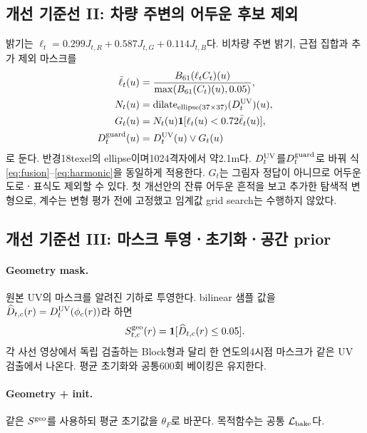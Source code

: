 \documentclass[11pt,a4paper]{article}
\newcommand{\ind}{\mathbf{1}}
\newcommand{\dilate}{\operatorname{dilate}}
\begin{document}
\subsection{개선 기준선 II: 차량 주변의 어두운 후보 제외}
밝기는 $\ell_t=0.299J_{t,R}+0.587J_{t,G}+0.114J_{t,B}$다. 비차량 주변 밝기, 근접 집합과 추가 제외 마스크를
\begin{align}
 \bar\ell_t(u)&=\frac{B_{61}(\ell_t C_t)(u)}{\max(B_{61}(C_t)(u),0.05)},\\
 N_t(u)&=\dilate_{\rm ellipse(37\times37)}(D_t^{\rm UV})(u),\\
 G_t(u)&=N_t(u)\ind[\ell_t(u)<0.72\bar\ell_t(u)],\\
 D_t^{\rm guard}(u)&=D_t^{\rm UV}(u)\lor G_t(u)
\end{align}
로 둔다. 반경18texel의 ellipse이며1024격자에서 약2.1m다. $D_t^{\rm UV}$를$D_t^{\rm guard}$로 바꿔 식\eqref{eq:fusion}--\eqref{eq:harmonic}을 동일하게 적용한다. $G_t$는 그림자 정답이 아니므로 어두운 도로ㆍ표식도 제외할 수 있다. 첫 개선안의 잔류 어두운 흔적을 보고 추가한 탐색적 변형으로, 계수는 변형 평가 전에 고정했고 임계값 grid search는 수행하지 않았다.

\subsection{개선 기준선 III: 마스크 투영ㆍ초기화ㆍ공간 prior}
\paragraph{Geometry mask.}
원본 UV의 마스크를 알려진 기하로 투영한다. bilinear 샘플 값을 $\widehat D_{t,c}(r)=D_t^{\rm UV}(\phi_c(r))$라 하면
\begin{equation}
 S_{t,c}^{\rm geo}(r)=\ind[\widehat D_{t,c}(r)\le0.05].
\end{equation}
각 사선 영상에서 독립 검출하는 Block형과 달리 한 연도의4시점 마스크가 같은 UV 검출에서 나온다. 평균 초기화와 공통600회 베이킹은 유지한다.

\paragraph{Geometry + init.}
같은 $S^{\rm geo}$를 사용하되 평균 초기값을 $\theta_F$로 바꾼다. 목적함수는 공통 $\mathcal L_{\rm bake}$다.
\end{document}
